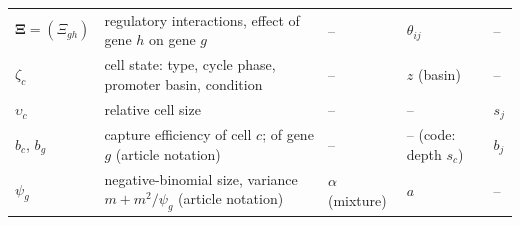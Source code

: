 \begin{table}[ht]
\begin{tabularx}{\textwidth}{@{}lYlll@{}}
    \(\boldsymbol{\Xi}=(\Xi_{gh})\) & regulatory interactions, effect of gene \(h\) on gene \(g\) & -- & \(\theta_{ij}\) & -- \\
    \(\zeta_{c}\) & cell state: type, cycle phase, promoter basin, condition & -- & \(z\) (basin) & -- \\
    \(\upsilon_{c}\) & relative cell size & -- & -- & \(s_{j}\) \\
    \(b_{c}\), \(b_{g}\) & capture efficiency of cell \(c\); of gene \(g\) (article notation) & -- & -- (code: depth
      \(s_{c}\)) & \(b_{j}\) \\
    \(\psi_{g}\) & negative-binomial size, variance \(m+m^{2}/\psi_{g}\) (article notation) & \(\alpha\) (mixture) &
      \(a\) & -- \\
    \bottomrule
  \end{tabularx}
\end{table}

